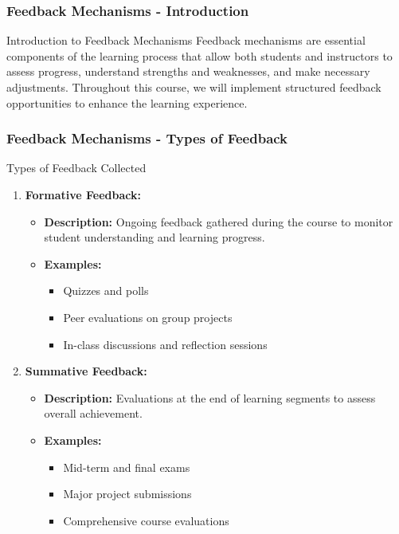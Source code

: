 \documentclass[aspectratio=169]{beamer}
\begin{document}
\begin{frame}[fragile]
    \frametitle{Feedback Mechanisms - Introduction}
    \begin{block}{Introduction to Feedback Mechanisms}
        Feedback mechanisms are essential components of the learning process that allow both students and instructors to assess progress, understand strengths and weaknesses, and make necessary adjustments. Throughout this course, we will implement structured feedback opportunities to enhance the learning experience.
    \end{block}
\end{frame}

\begin{frame}[fragile]
    \frametitle{Feedback Mechanisms - Types of Feedback}
    \begin{block}{Types of Feedback Collected}
        \begin{enumerate}
            \item \textbf{Formative Feedback:}
            \begin{itemize}
                \item \textbf{Description:} Ongoing feedback gathered during the course to monitor student understanding and learning progress.
                \item \textbf{Examples:}
                    \begin{itemize}
                        \item Quizzes and polls
                        \item Peer evaluations on group projects
                        \item In-class discussions and reflection sessions
                    \end{itemize}
            \end{itemize}
            \item \textbf{Summative Feedback:}
            \begin{itemize}
                \item \textbf{Description:} Evaluations at the end of learning segments to assess overall achievement.
                \item \textbf{Examples:}
                    \begin{itemize}
                        \item Mid-term and final exams
                        \item Major project submissions
                        \item Comprehensive course evaluations

\end{itemize}
\end{itemize}
\end{enumerate}
\end{block}
\end{frame}
\end{document}

